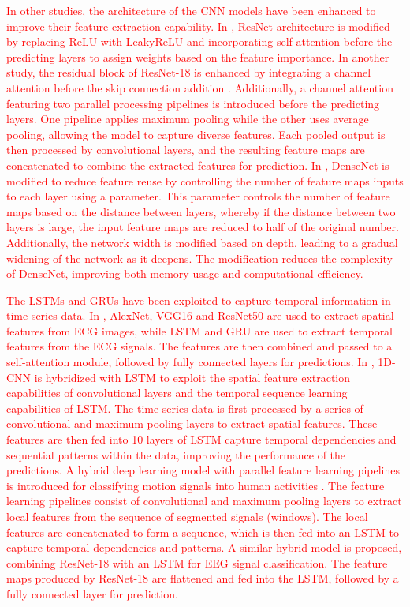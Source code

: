 \documentclass[preprint,12pt]{elsarticle}
\begin{document}
\textcolor{red}{In other studies, the architecture of the CNN models have been enhanced to improve their feature extraction capability. In \citep{sun_self-attentional_2023}, ResNet architecture is modified by replacing ReLU with LeakyReLU and incorporating self-attention before the predicting layers to assign weights based on the feature importance. In another study, the residual block of ResNet-18 is enhanced by integrating a channel attention before the skip connection addition \citep{dong_improved_2023}. Additionally, a channel attention featuring two parallel processing pipelines is introduced before the predicting layers. One pipeline applies maximum pooling while the other uses average pooling, allowing the model to capture diverse features. Each pooled output is then processed by convolutional layers, and the resulting feature maps are concatenated to combine the extracted features for prediction. In \citep{hou_application_2024}, DenseNet is modified to reduce feature reuse by controlling the number of feature maps inputs to each layer using a parameter. This parameter controls the number of feature maps based on the distance between layers, whereby if the distance between two layers is large, the input feature maps are reduced to half of the original number. Additionally, the network width is modified based on depth, leading to a gradual widening of the network as it deepens. The modification reduces the complexity of DenseNet, improving both memory usage and computational efficiency.}

\textcolor{red}{The LSTMs and GRUs have been exploited to capture temporal information in time series data. In \citep{narotamo_deep_2024}, AlexNet, VGG16 and ResNet50 are used to extract spatial features from ECG images, while LSTM and GRU are used to extract temporal features from the ECG signals. The features are then combined and passed to a self-attention module, followed by fully connected layers for predictions. In \citep{zhang_heart_2024}, 1D-CNN is hybridized with LSTM to exploit the spatial feature extraction capabilities of convolutional layers and the temporal sequence learning capabilities of LSTM. The time series data is first processed by a series of convolutional and maximum pooling layers to extract spatial features. These features are then fed into 10 layers of LSTM capture temporal dependencies and sequential patterns within the data, improving the performance of the predictions. A hybrid deep learning model with parallel feature learning pipelines is introduced for classifying motion signals into human activities \citep{mohd_noor_deep_2022}. The feature learning pipelines consist of convolutional and maximum pooling layers to extract local features from the sequence of segmented signals (windows). The local features are concatenated to form a sequence, which is then fed into an LSTM to capture temporal dependencies and patterns. A similar hybrid model is proposed, combining ResNet-18 with an LSTM for EEG signal classification. The feature maps produced by ResNet-18 are flattened and fed into the LSTM, followed by a fully connected layer for prediction.}
\end{document}
